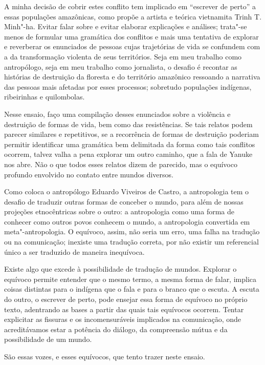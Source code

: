 A minha decisão de cobrir estes conflito tem implicado em ``escrever de
perto'' a essas populações amazônicas, como propõe a artista e teórica
vietnamita Trinh T. Minh"-ha. Evitar falar sobre e evitar elaborar
explicações e análises; trata"-se menos de formular uma gramática dos
conflitos e mais uma tentativa de explorar e reverberar os enunciados de
pessoas cujas trajetórias de vida se confundem com a da transformação
violenta de seus territórios. Seja em meu trabalho como antropólogo,
seja em meu trabalho como jornalista, o desafio é recontar as histórias
de destruição da floresta e do território amazônico ressoando a
narrativa das pessoas mais afetadas por esses processos; sobretudo
populações indígenas, ribeirinhas e quilombolas.

Nesse ensaio, faço uma compilação desses enunciados sobre a violência e
destruição de formas de vida, bem como das resistências. Se tais relatos
podem parecer similares e repetitivos, se a recorrência de formas de
destruição poderiam permitir identificar uma gramática bem delimitada da
forma como tais conflitos ocorrem, talvez valha a pena explorar um outro
caminho, que a fala de Yanuke nos abre. Não o que todos esses relatos
dizem de parecido, mas o equívoco profundo envolvido no contato entre
mundos diversos.

Como coloca o antropólogo Eduardo Viveiros de Castro, a antropologia tem
o desafio de traduzir outras formas de conceber o mundo, para além de
nossas projeções etnocêntricas sobre o outro: a antropologia como uma
forma de conhecer como outros povos conhecem o mundo, a antropologia
convertida em meta"-antropologia. O equívoco, assim, não seria um erro,
uma falha na tradução ou na comunicação; inexiste uma tradução correta,
por não existir um referencial único a ser traduzido de maneira
inequívoca.

Existe algo que excede à possibilidade de tradução de mundos. Explorar o
equívoco permite entender que o mesmo termo, a mesma forma de falar,
implica coisas distintas para o indígena que o fala e para o branco que
o escuta. A escuta do outro, o escrever de perto, pode ensejar essa
forma de equívoco no próprio texto, adentrando as bases a partir das
quais tais equívocos ocorrem. Tentar explicitar as fissuras e os
incomensuráveis implicados na comunicação, onde acreditávamos estar a
potência do diálogo, da compreensão mútua e da possibilidade de um
mundo.

São essas vozes, e esses equívocos, que tento trazer neste ensaio.

\asterisc

